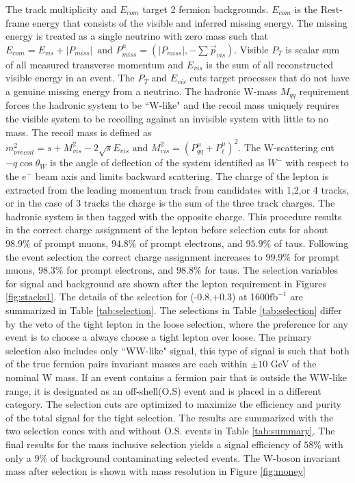 The track multiplicity and $E_{com}$ target 2 fermion backgrounds. $E_{com}$ is the Rest-frame energy that consists of the visible and inferred missing energy. The missing energy is treated as a single neutrino with zero mass such that $E_{com} = E_{vis} + |P_{miss}| \, \,  \, \text{and} \, \, P^\mu_{miss} = (|P_{miss}| , -\sum{\vec{p}_{vis}})$. Visible $P_T$ is scalar sum of all measured transverse momentum and $E_{vis}$ is the sum of all reconstructed visible energy in an event. The $P_T$ and $E_{vis}$ cuts target processes that do not have a genuine missing energy from a neutrino. The hadronic W-mass $M_{qq}$ requirement forces the hadronic system to be ``W-like" and the recoil mass uniquely requires the visible system to be recoiling against an invisible system with little to no mass. The recoil mass is defined as $m^2_{\nu recoil} = s + M^2_{vis} - 2\sqrt{s}E_{vis} \, \, \text{and} \, \, M^2_{vis} = ( P^{\mu}_{qq} +  P^{\mu}_{\ell})^2$. The W-scattering cut $-q\cos\theta_W$ is the angle of deflection of the system identified as $W^-$ with respect to the $e^-$ beam axis and limits backward scattering.  The charge of the lepton is extracted from the leading momentum track from candidates with 1,2,or 4 tracks, or in the case of 3 tracks the charge is the sum of the three track charges. The hadronic system is then tagged with the opposite charge.  This procedure results in the correct charge assignment of the lepton before selection cuts for about $98.9\%$ of prompt muons, $94.8\%$ of prompt electrons, and $95.9\%$ of taus. Following the event selection the correct charge assignment increases to $99.9\%$ for prompt muons, $98.3\%$ for prompt electrons, and $98.8\%$ for taus. The selection variables for signal and background are shown after the lepton requirement in Figures \ref{fig:stacks1}.  The details of the selection for (-0.8,+0.3) at 1600$\text{fb}^{-1}$ are summarized in Table \ref{tab:selection}. The selections in Table \ref{tab:selection} differ by the veto of the tight lepton in the loose selection, where the preference for any event is to choose a always choose a tight lepton over loose. The primary selection also includes only ``WW-like" signal, this type of signal is such that both of the true fermion pairs invariant masses are each within $\pm10$ GeV of the nominal W mass. If an event contains a fermion pair that is outside the WW-like range, it is designated as an off-shell(O.S) event and is placed in a different category. The selection cuts are optimized to maximize the efficiency and purity of the total signal for the tight selection. The results are summarized with the two selection cones with and without O.S. events in Table \ref{tab:summary}. The final results for the mass inclusive selection yields a signal efficiency of $58\%$ with only a $9\%$ of background contaminating selected events. The W-boson invariant mass after selection is shown with mass resolution in Figure \ref{fig:money}

